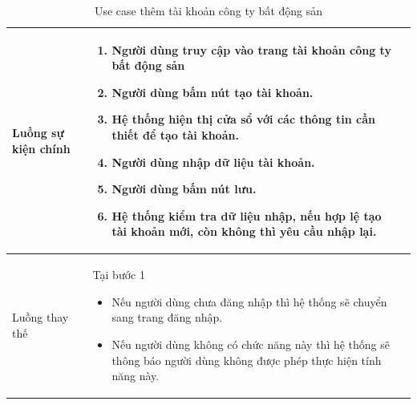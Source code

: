 \documentclass[12pt,a4paper]{article}
\begin{document}
\begin{table}[H]
\begin{tabular}{|p{3.5cm}|p{11.5cm}|c|}
            Luồng sự kiện chính & \vspace{-.8cm}\begin{enumerate}
                                                    \item Người dùng truy cập vào trang tài khoản công ty bất động sản
                                                    \item  Người dùng bấm nút tạo tài khoản.
                                                    \item  Hệ thống hiện thị cửa sổ với các thông tin cần thiết để tạo tài khoản.
                                                    \item  Người dùng nhập dữ liệu tài khoản.
                                                    \item Người dùng bấm nút lưu.
                                                    \item Hệ thống kiểm tra dữ liệu nhập, nếu hợp lệ tạo tài khoản mới, còn không thì yêu cầu nhập lại.
            \end{enumerate}
            \\
            \hline
            Luồng thay thế & Tại bước 1\newline
            \vspace{-.8cm}\begin{itemize}
                              \item Nếu người dùng chưa đăng nhập thì hệ thống sẽ chuyển sang trang đăng nhập.
                              \item  Nếu người dùng không có chức năng này thì hệ thống sẽ thông báo người dùng không được phép thực hiện tính năng này.
            \end{itemize}
            \\
            \hline
        \end{tabular}
        \caption{Use case thêm tài khoản công ty bất động sản}
    \end{table}


\end{document}
